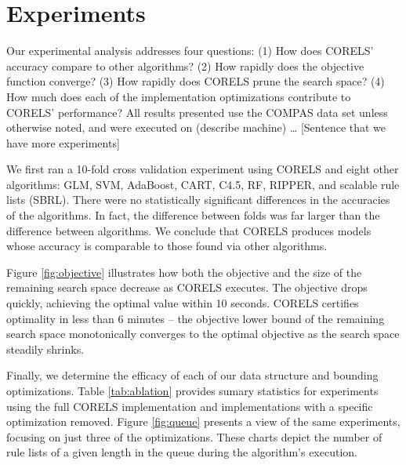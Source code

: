 \section{Experiments}
\label{sec:experiments}

Our experimental analysis addresses four questions:
(1) How does CORELS' accuracy compare to other algorithms?
(2) How rapidly does the objective function converge?
(3) How rapidly does CORELS prune the search space?
(4) How much does each of the implementation optimizations contribute to CORELS' performance?
All results presented use the COMPAS data set unless otherwise noted,
and were executed on (describe machine) \dots
[Sentence that we have more experiments]

We first ran a 10-fold cross validation experiment using CORELS and eight other algorithms:
GLM, SVM, AdaBoost, CART, C4.5, RF, RIPPER, and scalable rule lists (SBRL).
There were no statistically significant differences in the accuracies of the
algorithms. In fact, the difference between folds was far larger than the difference
between algorithms. We conclude that CORELS produces models whose accuracy is comparable
to those found via other algorithms.

Figure \ref{fig:objective} illustrates how both the objective and the size of
the remaining search space decrease as CORELS executes.
The objective drops quickly, achieving the optimal value within 10 seconds.
CORELS certifies optimality in less than 6 minutes --
the objective lower bound of the remaining search space
monotonically converges to the optimal objective
as the search space steadily shrinks.

Finally, we determine the efficacy of each of our data structure and bounding
optimizations.
Table \ref{tab:ablation} provides sumary statistics for experiments using
the full CORELS implementation and implementations with a specific
optimization removed.
Figure \ref{fig:queue} presents a view of the same experiments, focusing
on just three of the optimizations. These charts depict the number of rule
lists of a given length in the queue during the algorithm's execution.


